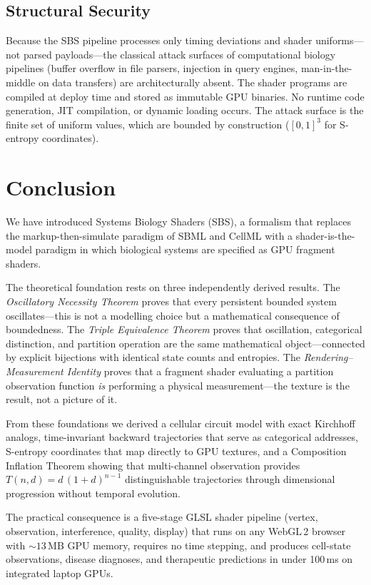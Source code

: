 \documentclass[11pt,twocolumn,a4paper]{article}
\begin{document}
\subsection{Structural Security}

Because the SBS pipeline processes only timing deviations and shader
uniforms---not parsed payloads---the classical attack surfaces of
computational biology pipelines (buffer overflow in file parsers,
injection in query engines, man-in-the-middle on data transfers) are
architecturally absent.  The shader programs are compiled at deploy
time and stored as immutable GPU binaries.  No runtime code generation,
JIT compilation, or dynamic loading occurs.  The attack surface is the
finite set of uniform values, which are bounded by construction
($[0,1]^3$ for S-entropy coordinates).


\section{Conclusion}
\label{sec:conclusion}

We have introduced Systems Biology Shaders (SBS), a formalism that
replaces the markup-then-simulate paradigm of SBML and CellML with a
shader-is-the-model paradigm in which biological systems are specified
as GPU fragment shaders.

The theoretical foundation rests on three independently derived
results.  The \emph{Oscillatory Necessity Theorem} proves that every
persistent bounded system oscillates---this is not a modelling
choice but a mathematical consequence of boundedness.  The
\emph{Triple Equivalence Theorem} proves that oscillation, categorical
distinction, and partition operation are the same mathematical
object---connected by explicit bijections with identical state counts
and entropies.  The \emph{Rendering--Measurement Identity} proves that
a fragment shader evaluating a partition observation function
\emph{is} performing a physical measurement---the texture is the
result, not a picture of it.

From these foundations we derived a cellular circuit model with exact
Kirchhoff analogs, time-invariant backward trajectories that serve as
categorical addresses, S-entropy coordinates that map directly to GPU
textures, and a Composition Inflation Theorem showing that
multi-channel observation provides $T(n,d) = d\,(1+d)^{n-1}$
distinguishable trajectories through dimensional progression without
temporal evolution.

The practical consequence is a five-stage GLSL shader pipeline
(vertex, observation, interference, quality, display) that runs on any
WebGL\,2 browser with $\sim\!13$\,MB GPU memory, requires no time
stepping, and produces cell-state observations, disease diagnoses, and
therapeutic predictions in under 100\,ms on integrated laptop GPUs.
\end{document}
